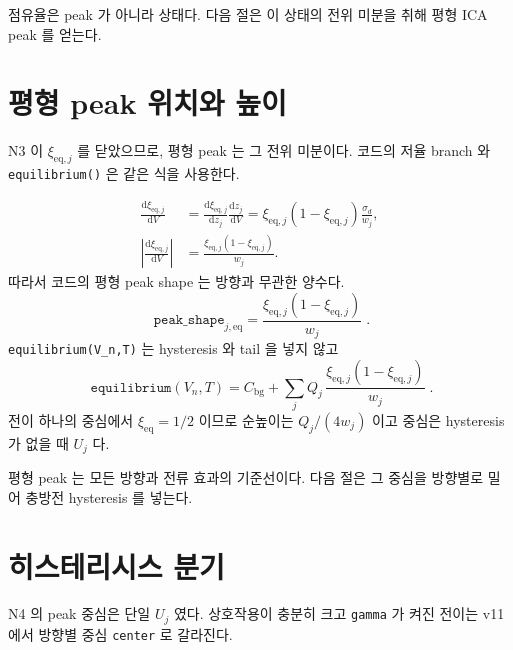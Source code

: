 \documentclass[11pt,a4paper]{article}
\newcommand{\dd}{\mathrm{d}}
\newcommand{\bg}{\mathrm{bg}}
\newcommand{\eq}{\mathrm{eq}}
\newcommand{\eqm}{\mathrm{eq}}
\begin{document}
점유율은 peak 가 아니라 상태다. 다음 절은 이 상태의 전위 미분을 취해 평형 ICA peak 를 얻는다.

\section{평형 peak 위치와 높이}\label{sec:n4}
N3 이 $\xi_{\eq,j}$ 를 닫았으므로, 평형 peak 는 그 전위 미분이다. 코드의 저율 branch 와 \texttt{equilibrium()} 은 같은 식을 사용한다.

\begin{align}
\frac{\dd\xi_{\eq,j}}{\dd V}
&=\frac{\dd\xi_{\eq,j}}{\dd z_j}\frac{\dd z_j}{\dd V}
=\xi_{\eq,j}(1-\xi_{\eq,j})\frac{\sigma_d}{w_j},\label{eq:dxidv}\\
\left|\frac{\dd\xi_{\eq,j}}{\dd V}\right|
&=\frac{\xi_{\eq,j}(1-\xi_{\eq,j})}{w_j}.\label{eq:absdxidv}
\end{align}
따라서 코드의 평형 peak shape 는 방향과 무관한 양수다.
\begin{equation}
\boxed{\;\texttt{peak\_shape}_{j,\eqm}=
\frac{\xi_{\eq,j}(1-\xi_{\eq,j})}{w_j}\;.}
\label{eq:eqpeakshape}
\end{equation}
\texttt{equilibrium(V\_n,T)} 는 hysteresis 와 tail 을 넣지 않고
\begin{equation}
\boxed{\;\texttt{equilibrium}(V_n,T)=
C_{\bg}+\sum_j Q_j\,\frac{\xi_{\eq,j}(1-\xi_{\eq,j})}{w_j}\;.}
\label{eq:equilibrium}
\end{equation}
전이 하나의 중심에서 $\xi_{\eq}=1/2$ 이므로 순높이는 $Q_j/(4w_j)$ 이고 중심은 hysteresis 가 없을 때 $U_j$ 다.

평형 peak 는 모든 방향과 전류 효과의 기준선이다. 다음 절은 그 중심을 방향별로 밀어 충방전 hysteresis 를 넣는다.

\section{히스테리시스 분기}\label{sec:n5}
N4 의 peak 중심은 단일 $U_j$ 였다. 상호작용이 충분히 크고 \texttt{gamma} 가 켜진 전이는 v11 에서 방향별 중심 \texttt{center} 로 갈라진다.
\end{document}
